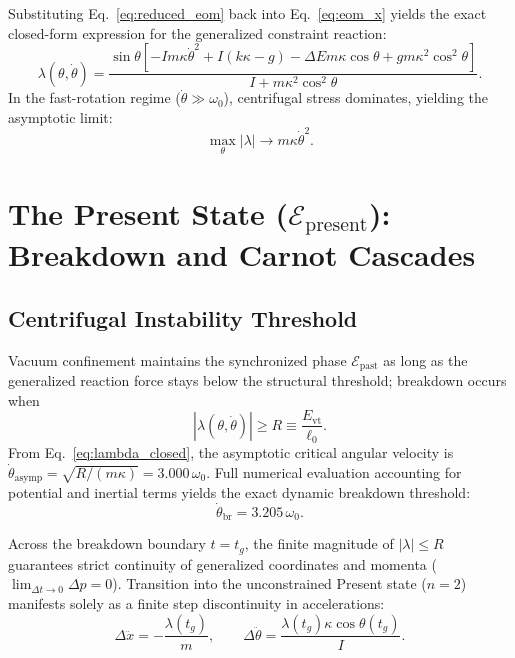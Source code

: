 \documentclass[aps,prc,twocolumn,superscriptaddress,amsmath,amssymb,nofootinbib]{revtex4-2}
\begin{document}
Substituting Eq.~\eqref{eq:reduced_eom} back into Eq.~\eqref{eq:eom_x} yields the exact closed-form expression for the generalized constraint reaction:
\begin{equation}
\lambda(\theta, \dot{\theta}) = \frac{\sin\theta \left[-I m\kappa \dot{\theta}^2 + I(k\kappa - g) - \Delta E m\kappa \cos\theta + g m\kappa^2 \cos^2\theta\right]}{I + m\kappa^2 \cos^2\theta}.
\label{eq:lambda_closed}
\end{equation}
In the fast-rotation regime (\(\dot{\theta} \gg \omega_0\)), centrifugal stress dominates, yielding the asymptotic limit:
\begin{equation}
\max_{\theta} |\lambda| \longrightarrow m\kappa \dot{\theta}^2.
\end{equation}

\section{The Present State (\(\mathcal{E}_{\text{present}}\)): Breakdown and Carnot Cascades}

\subsection{Centrifugal Instability Threshold}
Vacuum confinement maintains the synchronized phase \(\mathcal{E}_{\text{past}}\) as long as the generalized reaction force stays below the structural threshold; breakdown occurs when
\begin{equation}
|\lambda(\theta, \dot{\theta})| \ge R \equiv \frac{E_{\text{vt}}}{\ell_0}.
\label{eq:break_criterion}
\end{equation}
From Eq.~\eqref{eq:lambda_closed}, the asymptotic critical angular velocity is \(\dot{\theta}_{\text{asymp}} = \sqrt{R/(m\kappa)} = 3.000\,\omega_0\). Full numerical evaluation accounting for potential and inertial terms yields the exact dynamic breakdown threshold:
\begin{equation}
\dot{\theta}_{\text{br}} = 3.205\,\omega_0.
\label{eq:theta_crit}
\end{equation}

Across the breakdown boundary \(t = t_g\), the finite magnitude of \(|\lambda| \le R\) guarantees strict continuity of generalized coordinates and momenta (\(\lim_{\Delta t \to 0} \Delta p = 0\)). Transition into the unconstrained Present state (\(n=2\)) manifests solely as a finite step discontinuity in accelerations:
\begin{equation}
\Delta \ddot{x} = -\frac{\lambda(t_g)}{m}, \qquad \Delta \ddot{\theta} = \frac{\lambda(t_g)\kappa \cos\theta(t_g)}{I}.
\end{equation}
\end{document}
